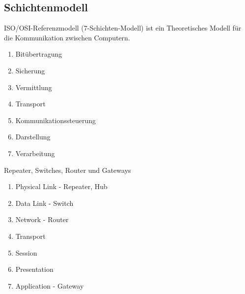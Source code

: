 \documentclass[a4paper]{article}
\begin{document}
\newpage
\subsection{Schichtenmodell}

ISO/OSI-Referenzmodell (7-Schichten-Modell) ist ein Theoretisches Modell für die Kommunikation zwischen Computern.

\begin{enumerate}
    \item Bitübertragung
    \item Sicherung
    \item Vermittlung
    \item Transport
    \item Kommunikationssteuerung
    \item Darstellung
    \item Verarbeitung
\end{enumerate}

Repeater, Switches, Router und Gateways

\begin{enumerate}
    \item Physical Link - Repeater, Hub
    \item Data Link - Switch
    \item Network - Router
    \item Transport
    \item Session
    \item Presentation
    \item Application - Gateway
\end{enumerate}
\end{document}
